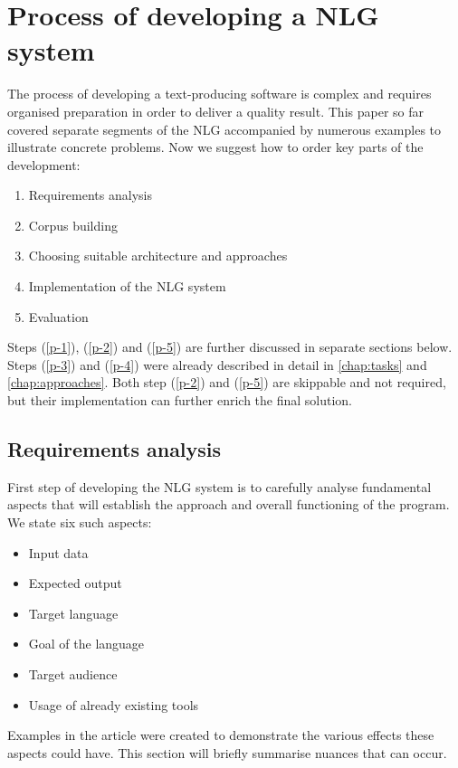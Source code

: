 \chapter{Process of developing a NLG system}\label{chap:process}

The process of developing a text-producing software is complex and requires organised preparation in order to deliver a quality result. This paper so far covered separate segments of the NLG accompanied by numerous examples to illustrate concrete problems. Now we suggest how to order key parts of the development:
\begin{enumerate}
	\item Requirements analysis \label{p-1}
	\item Corpus building \label{p-2}
	\item Choosing suitable architecture and approaches \label{p-3}
	\item Implementation of the NLG system \label{p-4}
	\item Evaluation \label{p-5}
\end{enumerate}

Steps (\ref{p-1}), (\ref{p-2}) and (\ref{p-5}) are further discussed in separate sections below. Steps (\ref{p-3}) and (\ref{p-4}) were already described in detail in \autoref{chap:tasks} and \autoref{chap:approaches}. Both step (\ref{p-2}) and (\ref{p-5}) are skippable and not required, but their implementation can further enrich the final solution.

\section{Requirements analysis}

First step of developing the NLG system is to carefully analyse fundamental aspects that will establish the approach and overall functioning of the program. We state six such aspects:
\begin{itemize}
	\item Input data
	\item Expected output
	\item Target language
	\item Goal of the language 
	\item Target audience
	\item Usage of already existing tools  
\end{itemize}

Examples in the article were created to demonstrate the various effects these aspects could have. This section will briefly summarise nuances that can occur. 

